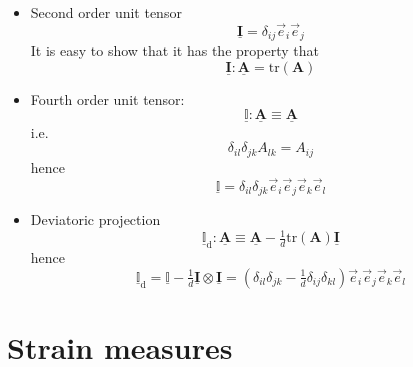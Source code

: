 \documentclass[fleqn, colorlinks]{goose-article}
\newcommand\T[1]{\underline{\bm{{#1}}}}
\newcommand\TT[1]{\underline{\mathbb{{#1}}}}
\begin{document}
\begin{itemize}

    \item Second order unit tensor
    \begin{equation}
        \T{I} = \delta_{ij} \vec{e}_i \vec{e}_j
    \end{equation}
    It is easy to show that it has the property that
    \begin{equation}
        \T{I} : \T{A} = \mathrm{tr} ( \bm{A} )
    \end{equation}

    \item Fourth order unit tensor:
    \begin{equation}
        \TT{I} : \T{A} \equiv \T{A}
    \end{equation}
    i.e.
    \begin{equation}
        \delta_{il} \delta_{jk} A_{lk} = A_{ij}
    \end{equation}
    hence
    \begin{equation}
        \TT{I} = \delta_{il} \delta_{jk} \vec{e}_i \vec{e}_j \vec{e}_k \vec{e}_l
    \end{equation}

    \item Deviatoric projection
    \begin{equation}
        \TT{I}_\mathrm{d} : \T{A} \equiv \T{A} - \tfrac{1}{d} \mathrm{tr} ( \bm{A} ) \T{I}
    \end{equation}
    hence
    \begin{equation}
        \TT{I}_\mathrm{d} = \TT{I} - \tfrac{1}{d} \T{I} \otimes \T{I}
        = \left( \delta_{il} \delta_{jk} - \tfrac{1}{d} \delta_{ij} \delta_{kl} \right)
        \vec{e}_i \vec{e}_j \vec{e}_k \vec{e}_l
    \end{equation}

\end{itemize}

\section{Strain measures}
\label{sec:nomenclature::strain}
\end{document}
